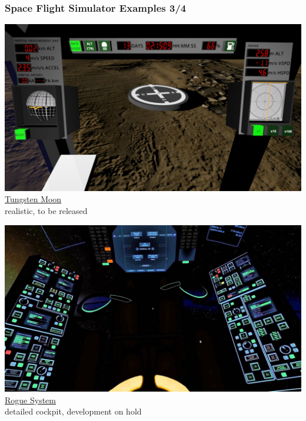 \documentclass[aspectratio=169,11pt,xcolor=dvipsnames]{beamer}
\begin{document}
\begin{frame}
  \frametitle{Space Flight Simulator Examples 3/4}
  \begin{minipage}[t]{0.49\textwidth}
    \begin{center}
      \includegraphics[width=\textwidth]{tungsten-moon}\\
      \href{https://tungstenmoon.com/}{Tungsten Moon}\\
      realistic, to be released
    \end{center}
  \end{minipage}
  \begin{minipage}[t]{0.49\textwidth}
    \begin{center}
      \includegraphics[width=\textwidth]{rogue-system}\\
      \href{https://imagespaceinc.com/rogsys/}{Rogue System}\\
      detailed cockpit, development on hold
    \end{center}
  \end{minipage}
\end{frame}
\end{document}
